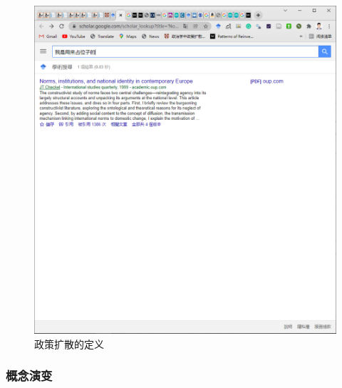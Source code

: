 \documentclass[
  12pt,
]{ctexart}
\begin{document}
\begin{figure}
\includegraphics[width=1\linewidth]{../figures/ngram} \caption{政策扩散的定义}\label{fig:unnamed-chunk-2}
\end{figure}

\hypertarget{ux6982ux5ff5ux6f14ux53d8}{%
\subsubsection{概念演变}\label{ux6982ux5ff5ux6f14ux53d8}}
\end{document}
